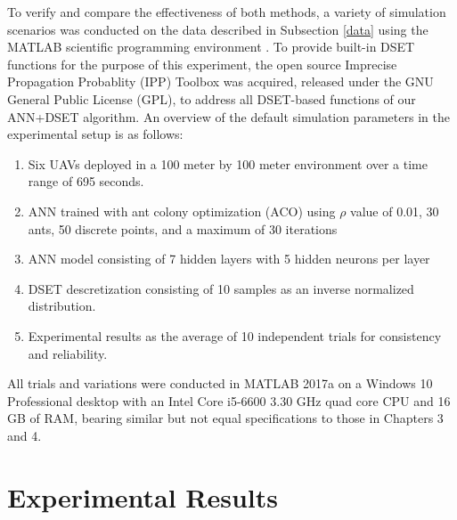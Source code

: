 \documentclass[12pt]{uthesis-v12}  %
\begin{document}
To verify and compare the effectiveness of both methods, a variety of simulation scenarios was conducted on the data described in Subsection \ref{data} using the MATLAB scientific programming environment \cite{matlab}. 
To provide built-in DSET functions for the purpose of this experiment, the open source Imprecise Propagation Probablity (IPP) Toolbox was acquired, released under the GNU General Public License (GPL), to address all DSET-based functions of our ANN+DSET algorithm. 
An overview of the default simulation parameters in the experimental setup is as follows:
\begin{enumerate}
\item Six UAVs deployed in a 100 meter by 100 meter environment over a time range of 695 seconds.
\item ANN trained with ant colony optimization (ACO) using $\rho$ value of 0.01, 30 ants, 50 discrete points, and a maximum of 30 iterations
\item ANN model consisting of 7 hidden layers with 5 hidden neurons per layer
\item DSET descretization consisting of 10 samples as an inverse normalized distribution.
\item Experimental results as the average of 10 independent trials for consistency and reliability.
\end{enumerate}
All trials and variations were conducted in MATLAB 2017a on a Windows 10 Professional desktop with an Intel Core i5-6600 3.30 GHz quad core CPU and 16 GB of RAM, bearing similar but not equal specifications to those in Chapters 3 and 4.

\section{Experimental Results}
\label{results2}
\end{document}

